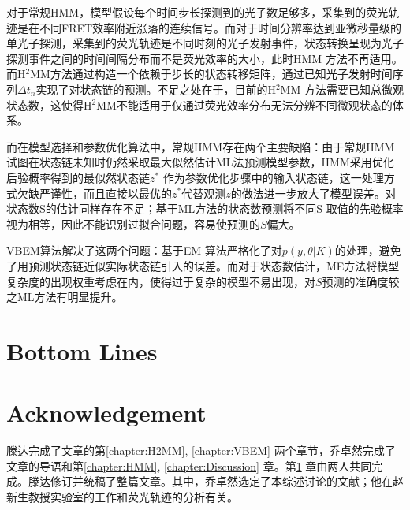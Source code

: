 \documentclass[11pt, a4paper]{article}
\begin{document}
对于常规HMM，模型假设每个时间步长探测到的光子数足够多，采集到的荧光轨迹是在不同FRET效率附近涨落的连续信号。而对于时间分辨率达到亚微秒量级的单光子探测，采集到的荧光轨迹是不同时刻的光子发射事件，状态转换呈现为光子探测事件之间的时间间隔分布而不是荧光效率的大小，此时HMM 方法不再适用。而H$^2$MM方法通过构造一个依赖于步长的状态转移矩阵，通过已知光子发射时间序列$\Delta t_n$实现了对状态链的预测。不足之处在于，目前的H$^2$MM 方法需要已知总微观状态数，这使得H$^2$MM不能适用于仅通过荧光效率分布无法分辨不同微观状态的体系。

而在模型选择和参数优化算法中，常规HMM存在两个主要缺陷：由于常规HMM 试图在状态链未知时仍然采取最大似然估计ML法预测模型参数，HMM采用优化后验概率得到的最似然状态链$z^*$ 作为参数优化步骤中的输入状态链，这一处理方式欠缺严谨性，而且直接以最优的$z^*$代替观测$z$的做法进一步放大了模型误差。对状态数S的估计同样存在不足；基于ML方法的状态数预测将不同S 取值的先验概率视为相等，因此不能识别过拟合问题，容易使预测的$S$偏大。

VBEM算法解决了这两个问题：基于EM 算法严格化了对$p(y,\theta|K)$的处理，避免了用预测状态链近似实际状态链引入的误差。而对于状态数估计，ME方法将模型复杂度的出现权重考虑在内，使得过于复杂的模型不易出现，对$S$预测的准确度较之ML方法有明显提升。

\section{Bottom Lines}\label{chapter:BottomLines}

\section{Acknowledgement}
    滕达完成了文章的第\ref{chapter:H2MM}, \ref{chapter:VBEM} 两个章节，乔卓然完成了文章的导语和第\ref{chapter:HMM}, \ref{chapter:Discussion} 章。第\ref{chapter:BottomLines} 章由两人共同完成。滕达修订并统稿了整篇文章。其中，乔卓然选定了本综述讨论的文献；他在赵新生教授实验室的工作和荧光轨迹的分析有关。


\small


\end{document}
